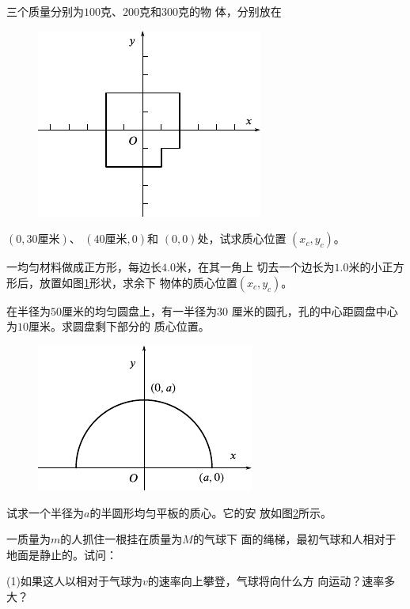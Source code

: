 \clearpage
\begin{exercises}

\exercise 三个质量分别为$ 100 $克、$ 200 $克和$ 300 $克的物
体，分别放在
\begin{figure}
  \centering
  \includegraphics{figure/fig08.10}
  \caption{}
  \label{fig:08.10}
\end{figure}
$ \left(0, 30 \text {厘米} \right) $、
$ \left(40 \text{厘米}, 0 \right) $和
$ \left(0, 0 \right) $处，试求质心位置
$ \left( x _ { c } , y _ { c } \right) $。

\exercise 一均匀材料做成正方形，每边长$ 4.0 $米，在其一角上
切去一个边长为$ 1.0 $米的小正方形后，放置如图\ref{fig:08.10}形状，求余下
物体的质心位置$ \left( x _ { c } , y _ { c } \right) $。

\exercise 在半径为$ 50 $厘米的均匀圆盘上，有一半径为$ 30 $
厘米的圆孔，孔的中心距圆盘中心为$ 10 $厘米。求圆盘剩下部分的
质心位置。

\begin{figure}
  \centering
  \includegraphics{figure/fig08.11}
  \caption{}
  \label{fig:08.11}
\end{figure}
\exercise 试求一个半径为$ a $的半圆形均匀平板的质心。它的安
放如图\ref{fig:08.11}所示。

\exercise 一质量为$ m $的人抓住一根挂在质量为$ M $的气球下
面的绳梯，最初气球和人相对于地面是静止的。试问：

(1)如果这人以相对于气球为$ v $的速率向上攀登，气球将向什么方
向运动？速率多大？


\end{exercises}
